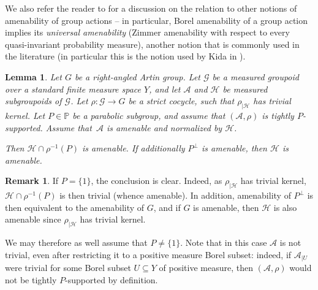 \documentclass[JEP,XML,SOM,Unicode,NoFloatCountersInSection,published]{cedram}
\let\mathcal\mathscr
\theoremstyle{plain}
\newtheorem{lemma}[theo]{Lemma}
\theoremstyle{definition}
\newtheorem{rk}[theo]{Remark}
\newcommand{\cala}{\mathcal{A}}
\newcommand{\calg}{\mathcal{G}}
\newcommand{\calh}{\mathcal{H}}
\begin{document}
We also refer the reader to \cite[\S 2]{GHL} for a discussion on the relation to other notions of amenability of group actions -- in particular, Borel amenability of a group action implies its \emph{universal amenability} (\ie Zimmer amenability with respect to every quasi-invariant probability measure), another notion that is commonly used in the literature (in particular this is the notion used by Kida in \cite{Kid-memoir}).


\begin{lemma}\label{lemma:amenable-normal}
Let $G$ be a right-angled Artin group. Let $\calg$ be a measured groupoid over a standard finite measure space $Y$, and let $\cala$ and $\calh$ be measured subgroupoids of $\calg$. Let $\rho:\calg\to G$ be a strict cocycle, such that $\rho_{|\calh}$ has trivial kernel. Let $P\in\mathbb{P}$ be a parabolic subgroup, and assume that $(\cala,\rho)$ is tightly $P$-supported. Assume that~$\cala$ is amenable and normalized by $\calh$.

Then $\calh\cap\rho^{-1}(P)$ is amenable. If additionally $P^{\perp}$ is amenable, then $\calh$ is amenable.
\end{lemma}

\begin{rk}
If $P=\{1\}$, the conclusion is clear. Indeed, as $\rho_{|\calh}$ has trivial kernel, $\calh\cap\rho^{-1}(P)$ is then trivial (whence amenable). In addition, amenability of $P^{\perp}$ is then equivalent to the amenability of $G$, and if $G$ is amenable, then $\calh$ is also amenable since $\rho_{|\calh}$ has trivial kernel.

We may therefore as well assume that $P\neq\{1\}$. Note that in this case $\cala$ is not trivial, even after restricting it to a positive measure Borel subset: indeed, if $\cala_{|U}$ were trivial for some Borel subset $U\subseteq Y$ of positive measure, then $(\cala,\rho)$ would not be tightly $P$-supported by definition.
\end{rk}
\end{document}
